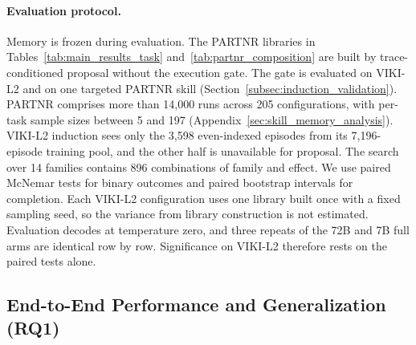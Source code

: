 \documentclass{article}
\theoremstyle{plain}
\theoremstyle{definition}
\theoremstyle{remark}
\begin{document}
\paragraph{Evaluation protocol.}
Memory is frozen during evaluation. The PARTNR libraries in Tables~\ref{tab:main_results_task} and~\ref{tab:partnr_composition} are built by trace-conditioned proposal without the execution gate. The gate is evaluated on VIKI-L2 and on one targeted PARTNR skill (Section~\ref{subsec:induction_validation}). PARTNR comprises more than 14{,}000 runs across 205 configurations, with per-task sample sizes between 5 and 197 (Appendix~\ref{sec:skill_memory_analysis}). VIKI-L2 induction sees only the 3{,}598 even-indexed episodes from its 7{,}196-episode training pool, and the other half is unavailable for proposal. The search over 14 families contains 896 combinations of family and effect. We use paired McNemar tests for binary outcomes and paired bootstrap intervals for completion. Each VIKI-L2 configuration uses one library built once with a fixed sampling seed, so the variance from library construction is not estimated. Evaluation decodes at temperature zero, and three repeats of the 72B and 7B full arms are identical row by row. Significance on VIKI-L2 therefore rests on the paired tests alone.

\subsection{End-to-End Performance and Generalization (RQ1)}
\label{subsec:main_results}
\label{subsec:generalization}
\end{document}
